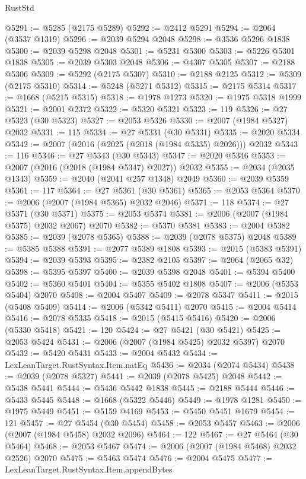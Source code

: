 \begin{lexlean}{RustStd}
\begin{coremodule}
@5291 := @5285 (@2175 @5289)
@5292 := @2412 @5291
@5294 := @2064 (@3537 @1319)
@5296 := @2039 @5294 @2048
@5298 := @3536 @5296 @1838
@5300 := @2039 @5298 @2048
@5301 := @5231 @5300
@5303 := @5226 @5301 @1838
@5305 := @2039 @5303 @2048
@5306 := @4307 @5305
@5307 := @2188 @5306
@5309 := @5292 (@2175 @5307)
@5310 := @2188 @2125
@5312 := @5309 (@2175 @5310)
@5314 := @5248 (@5271 @5312)
@5315 := @2175 @5314
@5317 := @1668 (@5215 @5315)
@5318 := @1978 @1273
@5320 := @1975 @5318 @1999
@5321 := @2001 @2372
@5322 := @5320 @5321
@5323 := 119
@5326 := @27 @5323 (@30 @5323)
@5327 := @2053 @5326
@5330 := @2007 (@1984 @5327) @2032
@5331 := 115
@5334 := @27 @5331 (@30 @5331)
@5335 := @2020 @5334
@5342 := @2007 (@2016 (@2025 (@2018 (@1984 @5335) @2026))) @2032
@5343 := 116
@5346 := @27 @5343 (@30 @5343)
@5347 := @2020 @5346
@5353 := @2007 (@2016 (@2018 (@1984 @5347) @2027)) @2032
@5355 := @2034 (@2035 @1343)
@5359 := @2040 (@2041 @257 @1348) @2049
@5360 := @2039 @5359
@5361 := 117
@5364 := @27 @5361 (@30 @5361)
@5365 := @2053 @5364
@5370 := @2006 (@2007 (@1984 @5365) @2032 @2046)
@5371 := 118
@5374 := @27 @5371 (@30 @5371)
@5375 := @2053 @5374
@5381 := @2006 (@2007 (@1984 @5375) @2032 @2067) @2070
@5382 := @5370 @5381
@5383 := @2004 @5382
@5385 := @2039 (@2078 @5365)
@5388 := @2039 (@2078 @5375) @2048
@5389 := @5385 @5388
@5391 := @2077 @5389 @1808
@5393 := @2015 (@5383 @5391)
@5394 := @2039 @5393
@5395 := @2382 @2105
@5397 := @2064 (@2065 @32)
@5398 := @5395 @5397
@5400 := @2039 @5398 @2048
@5401 := @5394 @5400
@5402 := @5360 @5401
@5404 := @5355 @5402 @1808
@5407 := @2006 (@5353 @5404) @2070
@5408 := @2004 @5407
@5409 := @2078 @5347
@5411 := @2015 (@5408 @5409)
@5414 := @2006 (@5342 @5411) @2070
@5415 := @2004 @5414
@5416 := @2078 @5335
@5418 := @2015 (@5415 @5416)
@5420 := @2006 (@5330 @5418)
@5421 := 120
@5424 := @27 @5421 (@30 @5421)
@5425 := @2053 @5424
@5431 := @2006 (@2007 (@1984 @5425) @2032 @5397) @2070
@5432 := @5420 @5431
@5433 := @2004 @5432
@5434 := LexLeanTarget.RustSyntax.Item.natEq
@5436 := @2034 (@2074 @5434)
@5438 := @2039 (@2078 @5327)
@5441 := @2039 (@2078 @5425) @2048
@5442 := @5438 @5441
@5444 := @5436 @5442 @1838
@5445 := @2188 @5444
@5446 := @5433 @5445
@5448 := @1668 (@5322 @5446)
@5449 := @1978 @1281
@5450 := @1975 @5449
@5451 := @5159 @4169
@5453 := @5450 @5451 @1679
@5454 := 121
@5457 := @27 @5454 (@30 @5454)
@5458 := @2053 @5457
@5463 := @2006 (@2007 (@1984 @5458) @2032 @2096)
@5464 := 122
@5467 := @27 @5464 (@30 @5464)
@5468 := @2053 @5467
@5474 := @2006 (@2007 (@1984 @5468) @2032 @2526) @2070
@5475 := @5463 @5474
@5476 := @2004 @5475
@5477 := LexLeanTarget.RustSyntax.Item.appendBytes

\end{coremodule}
\end{lexlean}
